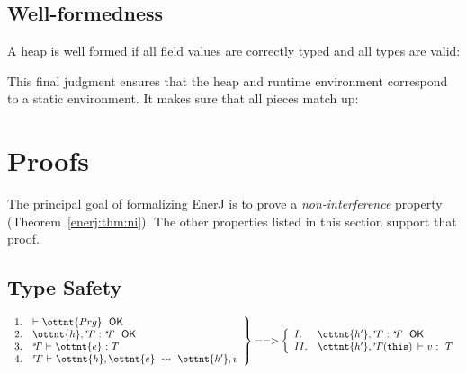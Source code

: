 \ottdefncheckedsemantics


\subsection{Well-formedness}

A heap is well formed if all field values are correctly typed and all
types are valid:

\ottdefnwfheap


This final judgment ensures that the heap and runtime environment
correspond to a static environment.
It makes sure that all pieces match up:

\ottdefnwfenvs



\section{Proofs}
\label{enerj:proofs}

The principal goal of formalizing EnerJ is to prove a \emph{non-interference}
property (Theorem~\ref{enerj:thm:ni}). The other properties listed in this section
support that proof.


\subsection{Type Safety}

\begin{theorem}
\label{enerj:thm:ts}
\[
\left.
\begin{array}{ll}
1. &  \textsf{$\vdash$} \  \ottnt{Prg} \ \  \textsf{OK} \\
2. &  \ottnt{h} ,  \mathit{ {^r}\!\Gamma} \  \textsf{:} \  \mathit{ {^s}\!\Gamma} \ \  \textsf{OK} \\
3. &  \mathit{ {^s}\!\Gamma} \  \textsf{$\vdash$} \  \ottnt{e} \  \textsf{:} \  T \\
4. &  \mathit{ {^r}\!\Gamma} \  \textsf{$\vdash$} \  \ottnt{h} ,  \ottnt{e} \ \leadsto\  \ottnt{h'} ,  v \\
\end{array}
\right\} ==> \left\{
\begin{array}{ll}
I.  &  \ottnt{h'} ,  \mathit{ {^r}\!\Gamma} \  \textsf{:} \  \mathit{ {^s}\!\Gamma} \ \  \textsf{OK} \\
II. &  \ottnt{h'} ,   \mathit{ {^r}\!\Gamma} \!\left( \texttt{\upshape{this}\,\!} \right)  \  \textsf{$\vdash$} \  v \  \textsf{:} \ \  T \\
\end{array}
\right.
\]
\end{theorem}


